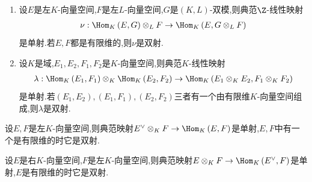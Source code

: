 \begin{proposition}{}{}
	\begin{enumerate}
		\item 设$E$是左$K$-向量空间,$F$是左$L$-向量空间,$G$是$\left(K,L\right)$-双模,则典范$\Z$-线性映射
		\begin{align*}
			\nu:\Hom_{K}\left(E,G\right)\otimes_{L}F\to\Hom_{K}\left(E,G\otimes_{L}F\right)
		\end{align*}
		是单射.若$E,F$都是有限维的,则$\nu$是双射.
		\item 设$K$是域,$E_{1},E_{2},F_{1},F_{2}$是$K$-向量空间,则典范$K$-线性映射
		\begin{align*}
			\lambda:\Hom_{K}\left(E_{1},F_{1}\right)\otimes_{K}\Hom_{K}\left(E_{2},F_{2}\right)\to\Hom_{K}\left(E_{1}\otimes_{K}E_{2},F_{1}\otimes_{K}F_{2}\right)
		\end{align*}
		是单射.若$\left(E_{1},E_{2}\right),\left(E_{1},F_{1}\right),\left(E_{2},F_{2}\right)$三者有一个由有限维$K$-向量空间组成,则$\lambda$是双射.
	\end{enumerate}
\end{proposition}

\begin{corollary}{}{}
	设$E,F$是左$K$-向量空间,则典范映射$E^{\vee}\otimes_{K}F\to\Hom_{K}\left(E,F\right)$是单射,$E,F$中有一个是有限维的时它是双射.
\end{corollary}

\begin{corollary}{}{}
	设$E$是右$K$-向量空间,$F$是左$K$-向量空间,则典范映射$E\otimes_{K}F\to\Hom_{K}\left(E^{\vee},F\right)$是单射,$E$是有限维的时它是双射.
\end{corollary}

